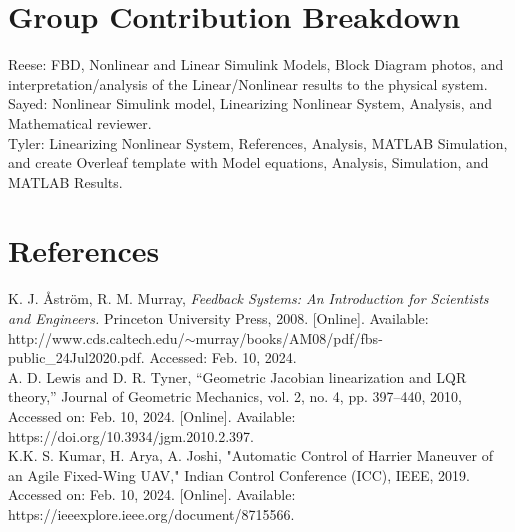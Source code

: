 \documentclass[conference]{IEEEtran}
\begin{document}
\newpage
\section{Group Contribution Breakdown}
Reese: FBD, Nonlinear and Linear Simulink Models, Block Diagram photos, and interpretation/analysis of the Linear/Nonlinear results to the physical system.\\

Sayed: Nonlinear Simulink model, Linearizing Nonlinear System, Analysis, and Mathematical reviewer.  \\

Tyler: Linearizing Nonlinear System, References, Analysis, MATLAB Simulation, and create Overleaf template with Model equations, Analysis, Simulation, and MATLAB Results. \\

\section{References}
\noindent [1] K. J. Åström, R. M. Murray, \textit{Feedback Systems: An Introduction for Scientists and Engineers.} Princeton University Press, 2008. [Online]. Available: http://www.cds.caltech.edu/$\sim$murray/books/AM08/pdf/fbs-public\_24Jul2020.pdf. 
Accessed: Feb. 10, 2024. \\

\noindent [2] A. D. Lewis and D. R. Tyner, “Geometric Jacobian linearization and LQR theory,” Journal of Geometric Mechanics, vol. 2, no. 4, pp. 397–440, 2010, Accessed on: Feb. 10, 2024. [Online]. Available: https://doi.org/10.3934/jgm.2010.2.397. \\

\noindent [3] K.K. S. Kumar, H. Arya, A. Joshi, "Automatic Control of Harrier Maneuver of an Agile Fixed-Wing UAV," Indian Control Conference (ICC), IEEE, 2019. Accessed on: Feb. 10, 2024. [Online]. Available: https://ieeexplore.ieee.org/document/8715566. \\
\end{document}
